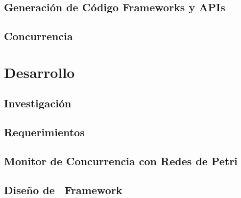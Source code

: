 \documentclass{report}
\begin{document}
        \chapter{Generación de Código Frameworks y APIs}
            \label{generacion_frameworks_apis}
            
            
        \chapter{Concurrencia}
            \label{cap:concurrencia}
            

    \part{Desarrollo}
        \chapter{Investigación}
            \label{cap:investigacion}
            
        \chapter{Requerimientos}
            
        \chapter{Monitor de Concurrencia con Redes de Petri}
        	\label{cap:petri_monitor}
            
            
            

        \chapter{Diseño de \nombreFramework \ Framework}
        	\label{cap:diseno_framework}
        	
            
            
            
            
            
\end{document}

